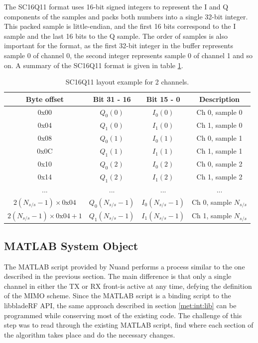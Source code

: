 \documentclass[12pt,a4paper]{report}
\begin{document}
The SC16Q11 format uses 16-bit signed integers to represent the I and Q components of the samples and packs both numbers into a single 32-bit integer. This packed sample is little-endian, and the first 16 bits correspond to the I sample and the last 16 bits to the Q sample. The order of samples is also important for the format, as the first 32-bit integer in the buffer represents sample 0 of channel 0, the second integer represents sample 0 of channel 1 and so on. A summary of the SC16Q11 format is given in table \ref{tab:sc16q11}. \cite{Nuand2019LibbladeRF2.2.1}

\begin{table}[h]
    \centering
    \begin{tabular}{c|c|c|c}
        Byte offset & Bit 31 - 16 & Bit 15 - 0 & Description\\ \hline
        0x00 & $Q_0(0)$ & $I_0(0)$ & Ch 0, sample 0 \\
        0x04 & $Q_1(0)$ & $I_1(0)$ & Ch 1, sample 0 \\
        0x08 & $Q_0(1)$ & $I_0(1)$ & Ch 0, sample 1 \\
        0x0C & $Q_1(1)$ & $I_1(1)$ & Ch 1, sample 1 \\
        0x10 & $Q_0(2)$ & $I_0(2)$ & Ch 0, sample 2 \\
        0x14 & $Q_1(2)$ & $I_1(2)$ & Ch 1, sample 2 \\
        ... & ... & ... & ... \\
        $2 (N_{s/s}-1) \times \text{0x04}$ & $Q_0(N_{s/s}-1)$ & $I_0(N_{s/s}-1)$ & Ch 0, sample $N_{s/s}$ \\
        $2 (N_{s/s}-1) \times \text{0x04}+ 1$ & $Q_1(N_{s/s}-1)$ & $I_1(N_{s/s}-1)$ & Ch 1, sample $N_{s/s}$ \\
    \end{tabular}
    \caption[SC16Q11 layout example for 2 channels.]{SC16Q11 layout example for 2 channels. \cite{Nuand2019LibbladeRF2.2.1}}
    \label{tab:sc16q11}
\end{table}

\subsection{MATLAB System Object} \label{met:int:mat}
The MATLAB script provided by Nuand performs a process similar to the one described in the previous section. The main difference is that only a single channel in either the TX or RX front-is active at any time, defying the definition of the MIMO scheme. Since the MATLAB script is a binding script to the libbladeRF API, the same approach described in section \ref{met:int:lib} can be programmed while conserving most of the existing code. The challenge of this step was to read through the existing MATLAB script, find where each section of the algorithm takes place and do the necessary changes.
\end{document}
